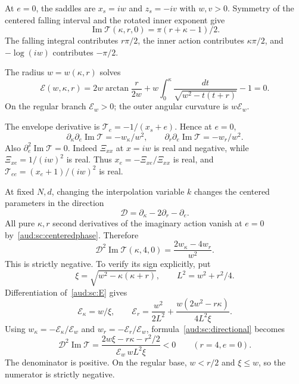 \documentclass[11pt,a4paper]{article}
\numberwithin{equation}{section}
\begin{document}
At $e=0$, the saddles are $x_s=iw$ and $z_s=-iv$ with $w,v>0$. Symmetry of the centered falling interval and the rotated inner exponent give
\begin{equation}\label{aud:sc:centeredphase}
 \operatorname{Im}\mathcal T(\kappa,r,0)=\pi(r+\kappa-1)/2.
\end{equation}
The falling integral contributes $r\pi/2$, the inner action contributes $\kappa\pi/2$, and $-\log(iw)$ contributes $-\pi/2$.

The radius $w=w(\kappa,r)$ solves
\begin{equation}\label{aud:sc:E}
 \mathcal E(w,\kappa,r)
 =2w\arctan\frac r{2w}
 +w\int_0^\kappa\frac{dt}{\sqrt{w^2-t(t+r)}}-1=0.
\end{equation}
On the regular branch $\mathcal E_w>0$; the outer angular curvature is $w\mathcal E_w$.

The envelope derivative is $\mathcal T_e=-1/(x_s+e)$. Hence at $e=0$,
\begin{equation}\label{aud:sc:cross}
 \partial_\kappa\partial_e\operatorname{Im}\mathcal T=-w_\kappa/w^2,
 \qquad
 \partial_r\partial_e\operatorname{Im}\mathcal T=-w_r/w^2.
\end{equation}
Also $\partial_e^2\operatorname{Im}\mathcal T=0$. Indeed $\Xi_{xx}$ at $x=iw$ is real and negative, while $\Xi_{xe}=1/(iw)^2$ is real. Thus $x_e=-\Xi_{xe}/\Xi_{xx}$ is real, and $\mathcal T_{ee}=(x_e+1)/(iw)^2$ is real.

At fixed $N,d$, changing the interpolation variable $k$ changes the centered parameters in the direction
\[
 \mathcal D=\partial_\kappa-2\partial_r-\partial_e.
\]
All pure $\kappa,r$ second derivatives of the imaginary action vanish at $e=0$ by~\eqref{aud:sc:centeredphase}. Therefore
\begin{equation}\label{aud:sc:directional}
 \mathcal D^2\operatorname{Im}\mathcal T(\kappa,4,0)
 =\frac{2w_\kappa-4w_r}{w^2}.
\end{equation}
This is strictly negative. To verify its sign explicitly, put
\[
 \xi=\sqrt{w^2-\kappa(\kappa+r)},\qquad L^2=w^2+r^2/4.
\]
Differentiation of~\eqref{aud:sc:E} gives
\[
 \mathcal E_\kappa=w/\xi,\qquad
 \mathcal E_r=\frac{w^2}{2L^2}+\frac{w(2w^2-r\kappa)}{4L^2\xi}.
\]
Using $w_\kappa=-\mathcal E_\kappa/\mathcal E_w$ and $w_r=-\mathcal E_r/\mathcal E_w$, formula~\eqref{aud:sc:directional} becomes
\begin{equation}\label{aud:sc:negativecurvature}
 \mathcal D^2\operatorname{Im}\mathcal T
 =\frac{2w\xi-r\kappa-r^2/2}{\mathcal E_w\,wL^2\xi}<0
 \qquad(r=4,e=0).
\end{equation}
The denominator is positive. On the regular base, $w<r/2$ and $\xi\le w$, so the numerator is strictly negative.
\end{document}
